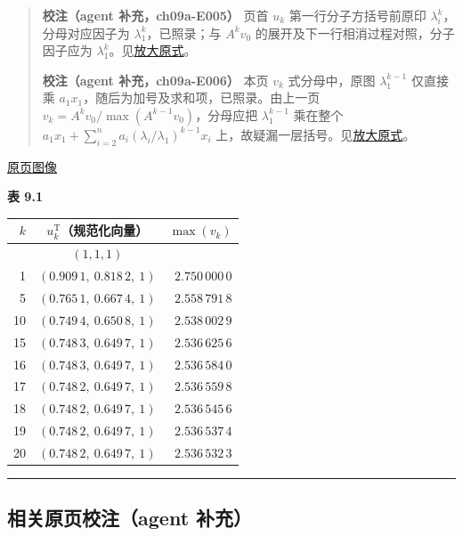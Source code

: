 \documentclass[
  10pt,
  fontset=fandol]{ctexart}
\newcounter{none} %
\begin{document}
\begin{quote}
\textbf{校注（agent 补充，ch09a-E005）} 页首 \(u_k\) 第一行分子方括号前原印 \(\lambda_i^k\)，分母对应因子为 \(\lambda_1^k\)，已照录；与 \(A^kv_0\) 的展开及下一行相消过程对照，分子因子应为 \(\lambda_1^k\)。见\href{../assets/ch09a/review-p237-u-k-numerator.png}{放大原式}。

\textbf{校注（agent 补充，ch09a-E006）} 本页 \(v_k\) 式分母中，原图 \(\lambda_1^{k-1}\) 仅直接乘 \(a_1x_1\)，随后为加号及求和项，已照录。由上一页 \(v_k=A^kv_0/\max(A^{k-1}v_0)\)，分母应把 \(\lambda_1^{k-1}\) 乘在整个 \(a_1x_1+\sum_{i=2}^na_i(\lambda_i/\lambda_1)^{k-1}x_i\) 上，故疑漏一层括号。见\href{../assets/ch09a/review-p237-v-k-denominator.png}{放大原式}。
\end{quote}

\href{../../source-images/pdf-238.jpeg}{原页图像}

\textbf{表 9.1}

{\def\LTcaptype{none} %
\begin{longtable}[]{@{}rcr@{}}
\toprule\noalign{}
\(k\) & \(u_k^{\mathrm T}\)（规范化向量） & \(\max(v_k)\) \\
\midrule\noalign{}
\endhead
\bottomrule\noalign{}
\endlastfoot
0 & \((1,1,1)\) & \\
1 & \((0.909\,1,\ 0.818\,2,\ 1)\) & \(2.750\,000\,0\) \\
5 & \((0.765\,1,\ 0.667\,4,\ 1)\) & \(2.558\,791\,8\) \\
10 & \((0.749\,4,\ 0.650\,8,\ 1)\) & \(2.538\,002\,9\) \\
15 & \((0.748\,3,\ 0.649\,7,\ 1)\) & \(2.536\,625\,6\) \\
16 & \((0.748\,3,\ 0.649\,7,\ 1)\) & \(2.536\,584\,0\) \\
17 & \((0.748\,2,\ 0.649\,7,\ 1)\) & \(2.536\,559\,8\) \\
18 & \((0.748\,2,\ 0.649\,7,\ 1)\) & \(2.536\,545\,6\) \\
19 & \((0.748\,2,\ 0.649\,7,\ 1)\) & \(2.536\,537\,4\) \\
20 & \((0.748\,2,\ 0.649\,7,\ 1)\) & \(2.536\,532\,3\) \\
\end{longtable}
}

\begin{center}\rule{0.5\linewidth}{0.5pt}\end{center}

\subsection{相关原页校注（agent 补充）}\label{ux76f8ux5173ux539fux9875ux6821ux6ce8agent-ux8865ux5145}
\end{document}
